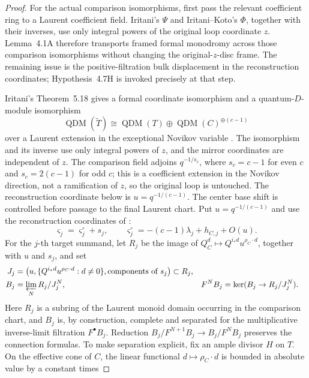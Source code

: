 \begin{proof}
For the actual comparison isomorphisms, first pass the relevant coefficient
ring to a Laurent coefficient field.  Iritani's \(\Psi\) and Iritani--Koto's
\(\Phi\), together with their inverses, use only integral powers of the
original loop coordinate \(z\).  Lemma~4.1A therefore transports framed formal
monodromy across those comparison isomorphisms without changing the
original-\(z\)-disc frame.  The remaining issue is the positive-filtration
bulk displacement in the reconstruction coordinates; Hypothesis~4.7H is
invoked precisely at that step.

Iritani's Theorem~5.18 gives a formal coordinate isomorphism and a
quantum-\(D\)-module isomorphism
\[
 \operatorname{QDM}(\widetilde T)\cong
 \operatorname{QDM}(T)\oplus
 \operatorname{QDM}(C)^{\oplus(c-1)}
\]
over a Laurent extension in the exceptional Novikov variable
\cite[Theorem~5.18]{IritaniBlowup}.  The isomorphism and its inverse use only
integral powers of \(z\), and the mirror coordinates are independent of \(z\).
The comparison field adjoins \(q^{-1/s_c}\), where
\(s_c=c-1\) for even \(c\) and \(s_c=2(c-1)\) for odd \(c\); this is a
coefficient extension in the Novikov direction, not a ramification of \(z\),
so the original loop is untouched.  The reconstruction coordinate below is
\(u=q^{-1/(c-1)}\).
The center base shift is controlled before passage to the final Laurent
chart.  Put \(u=q^{-1/(c-1)}\) and use the reconstruction coordinates of
\cite[Section~5.8.2]{IritaniBlowup}:
\[
 \varsigma_j=\varsigma_j^\circ+s_j,
 \qquad
 \varsigma_j^\circ=-(c-1)\lambda_j+h_{C,j}+O(u).
 \tag{4.4}
 \label{eq:blowup-reconstruction-coordinate}
\]
For the \(j\)-th target summand, let \(R_j\) be the image of
\(Q_C^d\mapsto Q^{i_*d}u^{\rho_C\cdot d}\), together with \(u\) and \(s_j\),
and set
\[
 \begin{aligned}
 J_j&=\bigl(u,\{Q^{i_*d}u^{\rho_C\cdot d}:d\ne0\},
             \text{components of }s_j\bigr)\subset R_j,\\
 B_j&=\varprojlim_N R_j/J_j^N,
 &F^NB_j&=\ker(B_j\to R_j/J_j^N).
 \end{aligned}
\]
Here \(R_j\) is a subring of the Laurent monoid domain occurring in the
comparison chart, and \(B_j\) is, by construction, complete and separated
for the multiplicative inverse-limit filtration \(F^\bullet B_j\).  Reduction
\(B_j/F^{N+1}B_j\to B_j/F^NB_j\) preserves the connection formulas.
To make separation explicit, fix an ample divisor \(H\) on \(T\).  On the
effective cone of \(C\), the linear functional
\(d\mapsto\rho_C\cdot d\) is bounded in absolute value by a constant times

\end{proof}
